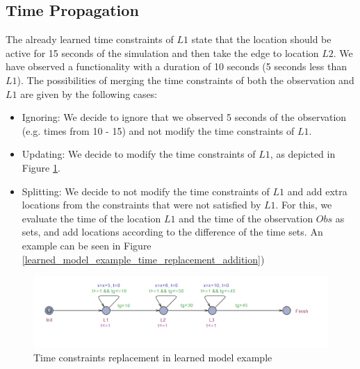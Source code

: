 \subsection{Time Propagation}
The already learned time constraints of $L1$ state that the location should be active for 15 seconds of the simulation and then take the edge to location $L2$. We have observed a functionality with a duration of 10 seconds (5 seconds less than $L1$). The possibilities of merging the time constraints of both the observation and $L1$ are given by the following cases:
\begin{itemize}
	\item Ignoring: We decide to ignore that we observed 5 seconds of the observation (e.g. times from 10 - 15) and not modify the time constraints of $L1$. 
	\item Updating: We decide to modify the time constraints of $L1$, as depicted in Figure \ref{learned_model_example_time_replacement}.
	\item Splitting: We decide to not modify the time constraints of $L1$ and add extra locations from the constraints that were not satisfied by $L1$. For this, we evaluate the time of the location $L1$ and the time of the observation $Obs$ as sets, and add locations according to the difference of the time sets. An example can be seen in Figure \ref{learned_model_example_time_replacement_addition})
\end{itemize}

\begin{figure}[h]
	\centering		
	\includegraphics[scale=0.5]{./pictures/learned_model_example_time_replacement.png}
	\caption{Time constraints replacement in learned model example}
	\label{learned_model_example_time_replacement}
\end{figure}

